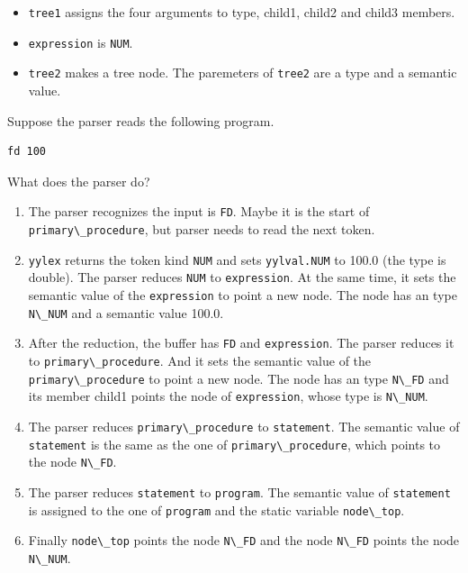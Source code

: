 \begin{itemize}
\tightlist
\item
  \passthrough{\lstinline!tree1!} assigns the four arguments to type,
  child1, child2 and child3 members.
\item
  \passthrough{\lstinline!expression!} is \passthrough{\lstinline!NUM!}.
\item
  \passthrough{\lstinline!tree2!} makes a tree node. The paremeters of
  \passthrough{\lstinline!tree2!} are a type and a semantic value.
\end{itemize}

Suppose the parser reads the following program.

\begin{lstlisting}
fd 100
\end{lstlisting}

What does the parser do?

\begin{enumerate}
\def\labelenumi{\arabic{enumi}.}
\tightlist
\item
  The parser recognizes the input is \passthrough{\lstinline!FD!}. Maybe
  it is the start of \passthrough{\lstinline!primary\_procedure!}, but
  parser needs to read the next token.
\item
  \passthrough{\lstinline!yylex!} returns the token kind
  \passthrough{\lstinline!NUM!} and sets
  \passthrough{\lstinline!yylval.NUM!} to 100.0 (the type is double).
  The parser reduces \passthrough{\lstinline!NUM!} to
  \passthrough{\lstinline!expression!}. At the same time, it sets the
  semantic value of the \passthrough{\lstinline!expression!} to point a
  new node. The node has an type \passthrough{\lstinline!N\_NUM!} and a
  semantic value 100.0.
\item
  After the reduction, the buffer has \passthrough{\lstinline!FD!} and
  \passthrough{\lstinline!expression!}. The parser reduces it to
  \passthrough{\lstinline!primary\_procedure!}. And it sets the semantic
  value of the \passthrough{\lstinline!primary\_procedure!} to point a
  new node. The node has an type \passthrough{\lstinline!N\_FD!} and its
  member child1 points the node of \passthrough{\lstinline!expression!},
  whose type is \passthrough{\lstinline!N\_NUM!}.
\item
  The parser reduces \passthrough{\lstinline!primary\_procedure!} to
  \passthrough{\lstinline!statement!}. The semantic value of
  \passthrough{\lstinline!statement!} is the same as the one of
  \passthrough{\lstinline!primary\_procedure!}, which points to the node
  \passthrough{\lstinline!N\_FD!}.
\item
  The parser reduces \passthrough{\lstinline!statement!} to
  \passthrough{\lstinline!program!}. The semantic value of
  \passthrough{\lstinline!statement!} is assigned to the one of
  \passthrough{\lstinline!program!} and the static variable
  \passthrough{\lstinline!node\_top!}.
\item
  Finally \passthrough{\lstinline!node\_top!} points the node
  \passthrough{\lstinline!N\_FD!} and the node
  \passthrough{\lstinline!N\_FD!} points the node
  \passthrough{\lstinline!N\_NUM!}.
\end{enumerate}

